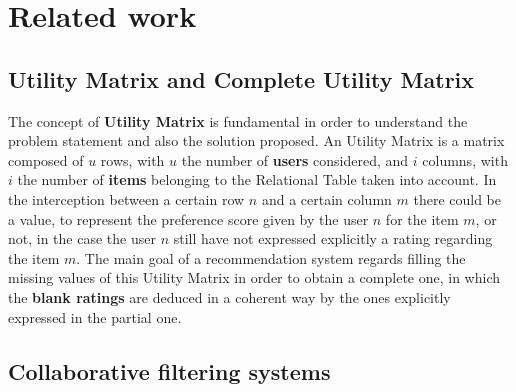 \section{Related work}
\label{sec:related_work}
\subsection{Utility Matrix and Complete Utility Matrix}
The concept of \textbf{Utility Matrix} is fundamental in order to understand the problem statement and also the solution proposed. An Utility Matrix is a matrix composed of $u$ rows, with $u$ the number of \textbf{users} considered, and $i$ columns, with $i$ the number of \textbf{items} belonging to the Relational Table taken into account. In the interception between a certain row $n$ and a certain column $m$ there could be a value, to represent the preference score given by the user $n$ for the item $m$, or not, in the case the user $n$ still have not expressed explicitly a rating regarding the item $m$.\cite{Book-ch9} The main goal of a recommendation system regards filling the missing values of this Utility Matrix in order to obtain a complete one, in which the \textbf{blank ratings} are deduced in a coherent way by the ones explicitly expressed in the partial one. 

\subsection{Collaborative filtering systems}

